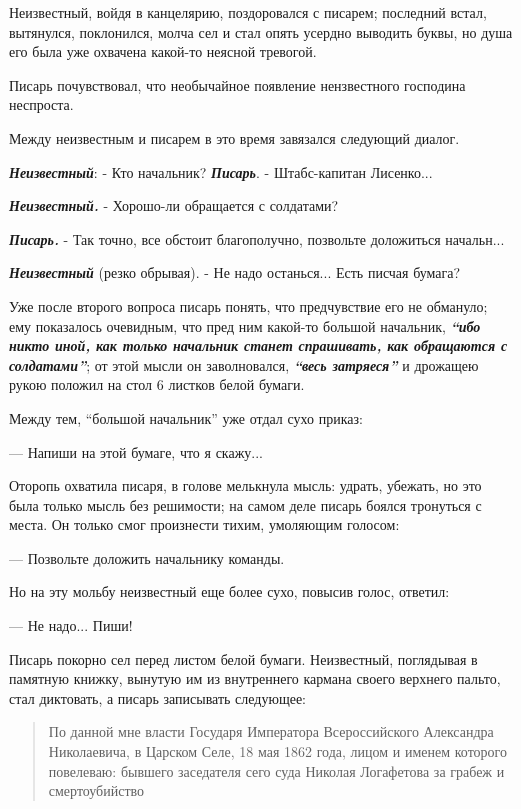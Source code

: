 \documentclass[a4paper,20pt]{article}
\begin{document}
Неизвестный, войдя в канцелярию, поздоровался с писарем; последний встал,
вытянулся, поклонился, молча сел и стал опять усердно выводить буквы, но душа
его была уже охвачена какой-то неясной тревогой.

Писарь почувствовал, что необычайное появление нензвестного господина
неспроста. 

Между неизвестным и писарем в это время завязался следующий диалог.

\textbf{\em Неизвестный}: - Кто начальник?
\textbf{\em Писарь}. - Штабс-капитан Лисенко...

\textbf{\em Неизвестный.} - Хорошо-ли обращается с солдатами?

\textbf{\em Писарь.} - Так точно, все обстоит благополучно, позвольте доложиться начальн...

\textbf{\em Неизвестный} (резко обрывая). - Не надо останься...  Есть писчая бумага?

Уже после второго вопроса писарь понять, что предчувствие его не обмануло; 
ему показалось очевидным, что пред ним какой-то большой начальник, \textbf{\em ``ибо никто иной,
как только начальник станет спрашивать, как обращаются с солдатами''}; от этой мысли он заволновался,
\textbf{\em ``весь затряеся''} и дрожащею рукою положил на стол 6 листков белой бумаги.

Между тем, ``большой начальник'' уже отдал сухо приказ:

— Напиши на этой бумаге, что я скажу...

Оторопь охватила писаря, в голове мелькнула мысль: удрать, убежать, но это была
только мысль без решимости; на самом деле писарь боялся тронуться с места. Он
только смог произнести тихим, умоляющим голосом:

— Позвольте доложить начальнику команды.

Но на эту мольбу неизвестный еще более сухо, повысив голос, ответил:

— Не надо... Пиши!

Писарь покорно сел перед листом белой бумаги.  Неизвестный, поглядывая в
памятную книжку, вынутую им из внутреннего кармана своего верхнего пальто, стал
диктовать, а писарь записывать следующее:

\begin{quote}
\em\bfseries

По данной мне власти Государя Императора Всероссийского Александра Николаевича,
в Царском Селе, 18 мая 1862 года, лицом и именем которого повелеваю:
бывшего заседателя сего суда Николая Логафетова за грабеж и
смертоубийство
\end{quote}
\end{document}
